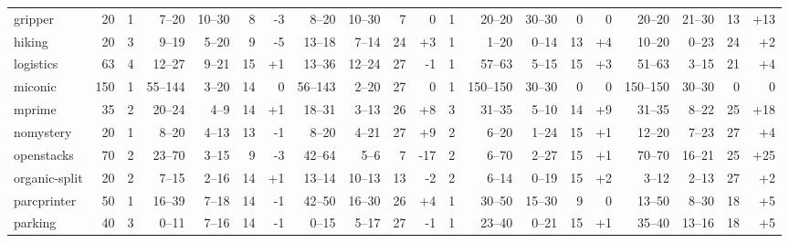 \documentclass{article}
\begin{document}
\begin{table}[h]
\begin{tabular}{l@{}rr|rrrr|rrrr|r|rrrr|rrrr}
       gripper &     20 &   1 &    7--20 &  10--30 &   8 &   {\color{red}-3} &    8--20 &  10--30 &   7 &                  0 &   1 &    20--20 &  30--30 &   0 &                  0 &    20--20 &  21--30 &  13 &  {\color{blue}+13} \\
        hiking &     20 &   3 &    9--19 &   5--20 &   9 &   {\color{red}-5} &   13--18 &   7--14 &  24 &   {\color{blue}+3} &   1 &     1--20 &   0--14 &  13 &   {\color{blue}+4} &    10--20 &   0--23 &  24 &   {\color{blue}+2} \\
     logistics &     63 &   4 &   12--27 &   9--21 &  15 &  {\color{blue}+1} &   13--36 &  12--24 &  27 &    {\color{red}-1} &   1 &    57--63 &   5--15 &  15 &   {\color{blue}+3} &    51--63 &   3--15 &  21 &   {\color{blue}+4} \\
       miconic &    150 &   1 &  55--144 &   3--20 &  14 &                 0 &  56--143 &   2--20 &  27 &                  0 &   1 &  150--150 &  30--30 &   0 &                  0 &  150--150 &  30--30 &   0 &                  0 \\
        mprime &     35 &   2 &   20--24 &    4--9 &  14 &  {\color{blue}+1} &   18--31 &   3--13 &  26 &   {\color{blue}+8} &   3 &    31--35 &   5--10 &  14 &   {\color{blue}+9} &    31--35 &   8--22 &  25 &  {\color{blue}+18} \\
     nomystery &     20 &   1 &    8--20 &   4--13 &  13 &   {\color{red}-1} &    8--20 &   4--21 &  27 &   {\color{blue}+9} &   2 &     6--20 &   1--24 &  15 &   {\color{blue}+1} &    12--20 &   7--23 &  27 &   {\color{blue}+4} \\
    openstacks &     70 &   2 &   23--70 &   3--15 &   9 &   {\color{red}-3} &   42--64 &    5--6 &   7 &   {\color{red}-17} &   2 &     6--70 &   2--27 &  15 &   {\color{blue}+1} &    70--70 &  16--21 &  25 &  {\color{blue}+25} \\
 organic-split &     20 &   2 &    7--15 &   2--16 &  14 &  {\color{blue}+1} &   13--14 &  10--13 &  13 &    {\color{red}-2} &   2 &     6--14 &   0--19 &  15 &   {\color{blue}+2} &     3--12 &   2--13 &  27 &   {\color{blue}+2} \\
   parcprinter &     50 &   1 &   16--39 &   7--18 &  14 &   {\color{red}-1} &   42--50 &  16--30 &  26 &   {\color{blue}+4} &   1 &    30--50 &  15--30 &   9 &                  0 &    13--50 &   8--30 &  18 &   {\color{blue}+5} \\
       parking &     40 &   3 &    0--11 &   7--16 &  14 &   {\color{red}-1} &    0--15 &   5--17 &  27 &    {\color{red}-1} &   1 &    23--40 &   0--21 &  15 &   {\color{blue}+1} &    35--40 &  13--16 &  18 &   {\color{blue}+5} \\

\end{tabular}
\end{table}
\end{document}
